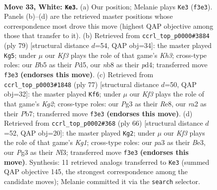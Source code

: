 \documentclass[11pt]{article}
\begin{document}
\clearpage

\begin{figure}[p]\centering
\begin{subfigure}{0.46\textwidth}\centering
\resizebox{\linewidth}{!}{%
\newchessgame
\chessboard[
  setfen={rn6/8/8/1B3pkp/3N4/pP3KP1/r7/1R6 w - - 1 33},
  showmover=false,
  pgfstyle=straightmove, color=movearrow, markmove={f3-e3}
]}
\caption{}
\end{subfigure}\hfill
\begin{subfigure}{0.46\textwidth}\centering
\resizebox{\linewidth}{!}{%
\newchessgame
\chessboard[
  setfen={8/p5p1/1r5k/3p4/3P1n1N/K6P/P2R2P1/8 b - - 0 40},
  showmover=false,
  pgfstyle=straightmove, color=movearrow, markmove={h6-g5}
]}
\caption{}
\end{subfigure}
\\[4pt]
\begin{subfigure}{0.46\textwidth}\centering
\resizebox{\linewidth}{!}{%
\newchessgame
\chessboard[
  setfen={4r3/1p4k1/2p1n2p/P1P1N3/4K2P/P1R5/8/8 b - - 8 39},
  showmover=false,
  pgfstyle=straightmove, color=movearrow, markmove={g7-f6}
]}
\caption{}
\end{subfigure}\hfill
\begin{subfigure}{0.46\textwidth}\centering
\resizebox{\linewidth}{!}{%
\newchessgame
\chessboard[
  setfen={1b4k1/3r2pp/R5n1/6P1/8/4BN2/5P2/6K1 w - - 1 34},
  showmover=false,
  pgfstyle=straightmove, color=movearrow, markmove={g1-g2}
]}
\caption{}
\end{subfigure}
\caption{\textbf{Move 33, White: \texttt{Ke3}.} (a) Our position; Melanie plays \texttt{Ke3} (\texttt{f3e3}). Panels (b)--(d) are the retrieved master positions whose correspondence most drove this move (highest QAP objective among those that transfer to it). (b) Retrieved from \texttt{ccrl\_top\_p0000\#3884} (ply 79) [structural distance $d$=54, QAP obj=34]: the master played \texttt{Kg5}; under $\mu$ our \emph{Kf3} plays the role of that game's \emph{Kh3}; cross-type roles: our \emph{B}b5 as their \emph{P}d5, our \emph{n}b8 as their \emph{p}d4; transferred move \texttt{f3e3} \textbf{(endorses this move)}. (c) Retrieved from \texttt{ccrl\_top\_p0003\#1848} (ply 77) [structural distance $d$=50, QAP obj=32]: the master played \texttt{Kf6}; under $\mu$ our \emph{Kf3} plays the role of that game's \emph{Kg2}; cross-type roles: our \emph{P}g3 as their \emph{R}e8, our \emph{r}a2 as their \emph{P}b7; transferred move \texttt{f3e3} \textbf{(endorses this move)}. (d) Retrieved from \texttt{ccrl\_top\_p0002\#368} (ply 66) [structural distance $d$=52, QAP obj=20]: the master played \texttt{Kg2}; under $\mu$ our \emph{Kf3} plays the role of that game's \emph{Kg1}; cross-type roles: our \emph{p}a3 as their \emph{B}e3, our \emph{P}g3 as their \emph{N}f3; transferred move \texttt{f3e3} \textbf{(endorses this move)}. Synthesis: 11 retrieved analogs transferred to \texttt{Ke3} (summed QAP objective 145, the strongest correspondence among the candidate moves); Melanie committed it via the \texttt{search} selector.}
\label{fig:thought-m64}
\end{figure}
\end{document}
